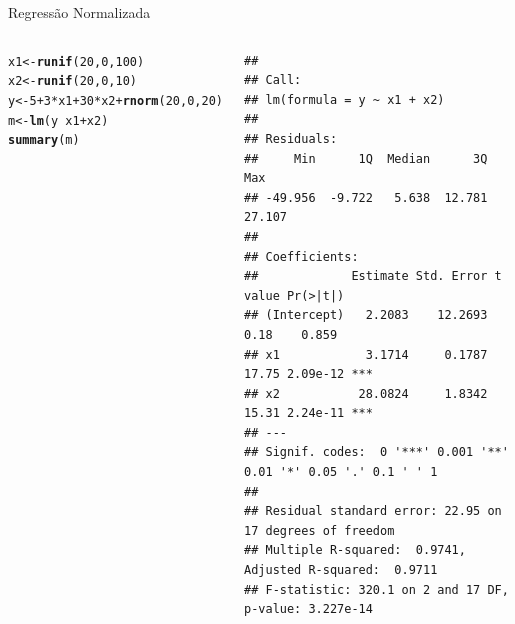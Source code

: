\documentclass{beamer}\usepackage[]{graphicx}\usepackage[]{color}
\makeatletter
\newcommand{\hlnum}[1]{\textcolor[rgb]{0.686,0.059,0.569}{#1}}%
\newcommand{\hlopt}[1]{\textcolor[rgb]{0,0,0}{#1}}%
\newcommand{\hlstd}[1]{\textcolor[rgb]{0.345,0.345,0.345}{#1}}%
\newcommand{\hlkwb}[1]{\textcolor[rgb]{0.69,0.353,0.396}{#1}}%
\newcommand{\hlkwd}[1]{\textcolor[rgb]{0.737,0.353,0.396}{\textbf{#1}}}%
\newenvironment{kframe}{%
 \def\at@end@of@kframe{}%
 \ifinner\ifhmode%
  \def\at@end@of@kframe{\end{minipage}}%
  \begin{minipage}{\columnwidth}%
 \fi\fi%
 \def\FrameCommand##1{\hskip\@totalleftmargin \hskip-\fboxsep
 \colorbox{shadecolor}{##1}\hskip-\fboxsep
     \hskip-\linewidth \hskip-\@totalleftmargin \hskip\columnwidth}%
 \MakeFramed {\advance\hsize-\width
   \@totalleftmargin\z@ \linewidth\hsize
   \@setminipage}}%
 {\par\unskip\endMakeFramed%
 \at@end@of@kframe}
\newenvironment{knitrout}{}{} %
\renewenvironment{knitrout}{\setlength{\topsep}{0mm}}{}
\makeatother
\begin{document}
\begin{frame}[fragile]{Regressão Normalizada}

\begin{columns}

\setlength{\topsep}{2pt}
\begin{knitrout}\tiny
{}\color{fgcolor}\begin{kframe}
\begin{alltt}
\hlstd{x1} \hlkwb{<-} \hlkwd{runif}\hlstd{(}\hlnum{20}\hlstd{,}\hlnum{0}\hlstd{,}\hlnum{100}\hlstd{)}
\hlstd{x2} \hlkwb{<-} \hlkwd{runif}\hlstd{(}\hlnum{20}\hlstd{,}\hlnum{0}\hlstd{,}\hlnum{10}\hlstd{)}
\hlstd{y} \hlkwb{<-} \hlnum{5} \hlopt{+} \hlnum{3}\hlopt{*}\hlstd{x1} \hlopt{+} \hlnum{30}\hlopt{*}\hlstd{x2} \hlopt{+} \hlkwd{rnorm}\hlstd{(}\hlnum{20}\hlstd{,}\hlnum{0}\hlstd{,}\hlnum{20}\hlstd{)}
\hlstd{m} \hlkwb{<-} \hlkwd{lm}\hlstd{(y} \hlopt{~} \hlstd{x1} \hlopt{+} \hlstd{x2)}
\hlkwd{summary}\hlstd{(m)}
\end{alltt}
\begin{verbatim}
## 
## Call:
## lm(formula = y ~ x1 + x2)
## 
## Residuals:
##     Min      1Q  Median      3Q     Max 
## -49.956  -9.722   5.638  12.781  27.107 
## 
## Coefficients:
##             Estimate Std. Error t value Pr(>|t|)    
## (Intercept)   2.2083    12.2693    0.18    0.859    
## x1            3.1714     0.1787   17.75 2.09e-12 ***
## x2           28.0824     1.8342   15.31 2.24e-11 ***
## ---
## Signif. codes:  0 '***' 0.001 '**' 0.01 '*' 0.05 '.' 0.1 ' ' 1
## 
## Residual standard error: 22.95 on 17 degrees of freedom
## Multiple R-squared:  0.9741,	Adjusted R-squared:  0.9711 
## F-statistic: 320.1 on 2 and 17 DF,  p-value: 3.227e-14
\end{verbatim}
\end{kframe}
\end{knitrout}


\end{columns}
\end{frame}
\end{document}
